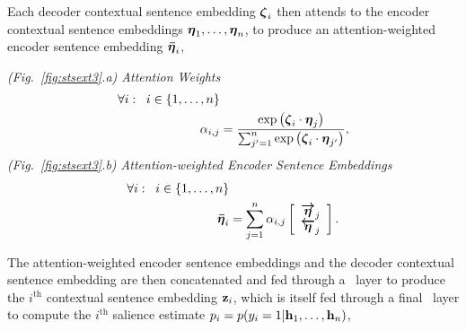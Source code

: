 \FloatBarrier


Each decoder contextual sentence embedding $\boldsymbol{\zeta}_i$ then attends
to the encoder contextual sentence embeddings $\boldsymbol{\eta}_1,\ldots,
\boldsymbol{\eta}_n$, to produce an attention-weighted encoder sentence
embedding $\boldsymbol{\bar{\eta}}_i$,
    
\vspace{10pt} \noindent \textit{(Fig.~\ref{fig:stsext3}.a) Attention Weights}
\begin{align}
    \forall i : \;\; i \in \{1,\ldots,n\}&\nonumber \\
    \alpha_{i,j} & = 
        \frac{\exp \left(\boldsymbol{\zeta}_i \cdot  \boldsymbol{\eta}_j \right)}{
            \sum_{j^\prime=1}^{n}\exp\left(  
                \boldsymbol{\zeta}_i \cdot  \boldsymbol{\eta}_{j^\prime} \right)},
\end{align}
\vspace{10pt} \noindent \textit{(Fig.~\ref{fig:stsext3}.b) Attention-weighted Encoder Sentence Embeddings} 
\begin{align}
    \forall i : \;\; i \in \{1,\ldots,n\}& \nonumber \\
    \boldsymbol{\bar{\eta}}_i & = 
        \sum_{j=1}^{n} \alpha_{i,j} \left[\begin{array}{c}
            \boldsymbol{\overrightarrow{\eta}}_j\\ 
            \boldsymbol{\overleftarrow{\eta}}_j\end{array}\right].
\end{align}

The attention-weighted encoder sentence embeddings and the decoder 
contextual sentence embedding are then concatenated and fed through a 
\feedforward~layer to produce the $i^\textrm{th}$ contextual sentence
embedding $\mathbf{z}_i$, which is itself fed through a final 
\feedforward~layer to compute the $i^\textrm{th}$ salience estimate
$p_i = p(y_i=1|\mathbf{h}_1,\ldots,\mathbf{h}_n)$,

